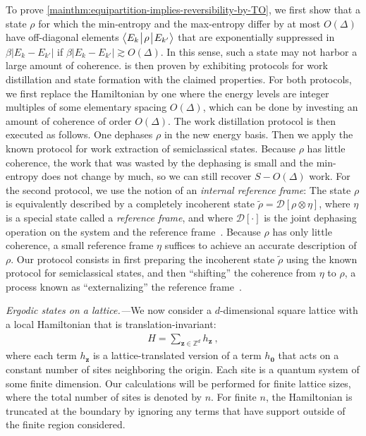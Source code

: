\documentclass[prl,reprint,longbibliography,superscriptaddress]{revtex4-1}
\newcounter{thm}
\renewcommand\paragraph[1]{\par\emph{#1.---}\kern2pt\relax\ignorespaces}
\begin{document}
To prove \cref{mainthm:equipartition-implies-reversibility-by-TO}, we first show
that a state $\rho$ for which the min-entropy and the max-entropy differ by at
most $O(\Delta)$ have off-diagonal elements $\bigl\langle {E_k}\hspace*{0.2ex}\big\vert\hspace*{0.2ex}{\rho}\hspace*{0.2ex}\big\vert\hspace*{0.2ex}{E_{k'}}\bigr\rangle $ that
are exponentially suppressed in $\beta\lvert {E_k-E_{k'}}\rvert $ if
$\beta\bigl\lvert {E_k-E_{k'}}\bigr\rvert \gtrsim O(\Delta)$.  In this sense, such a state may not
harbor a large amount of coherence.
 is then proven by
exhibiting protocols for work distillation and state formation with the claimed
properties.
For both protocols, we first replace the Hamiltonian by one where the energy
levels are integer multiples of some elementary spacing $O(\Delta)$, which can
be done by investing an amount of coherence of order $O(\Delta)$.
The work distillation protocol is then executed as follows.  One dephases $\rho$
in the new energy basis.  Then we apply the known protocol for work extraction
of semiclassical states.  Because $\rho$ has little coherence, the work that was
wasted by the dephasing is small and the min-entropy does not change by much, so
we can still recover $S-O(\Delta)$ work.
For the second protocol, we use the notion of an \emph{internal reference
  frame}: The state $\rho$ is equivalently described by a completely incoherent
state $\tilde{\rho} = \mathcal{D}[\rho\otimes\eta]$, where $\eta$ is a special
state called a \emph{reference frame}, and where $\mathcal{D}[\cdot]$ is the
joint dephasing operation on the system and the reference
frame~\cite{Bartlett2006IJQI_dialogue,Bartlett2007_refframes}.  Because $\rho$
has only little coherence, a small reference frame $\eta$ suffices to achieve an
accurate description of $\rho$.  Our protocol consists in first preparing the
incoherent state $\tilde{\rho}$ using the known protocol for semiclassical
states, and then ``shifting'' the coherence from $\eta$ to $\rho$, a process
known as ``externalizing'' the reference frame~\cite{Bartlett2007_refframes}.



\paragraph{Ergodic states on a lattice}We now consider a $d$-dimensional square lattice with a local Hamiltonian that
is translation-invariant:
\begin{align}
  H = \sum_{\boldsymbol{z}\in\mathbb{Z}^d} h_{\boldsymbol{z}}\ ,
\end{align}
where each term $h_{\boldsymbol{z}}$ is a lattice-translated version of a term
$h_{\boldsymbol{0}}$ that acts on a constant number of sites neighboring the
origin.  Each site is a quantum system of some finite dimension.  
Our calculations will be performed for finite lattice sizes, where the total
number of sites is denoted by $n$.  For finite $n$, the Hamiltonian is truncated
at the boundary by ignoring any terms that have support outside of the finite
region considered.
\end{document}
